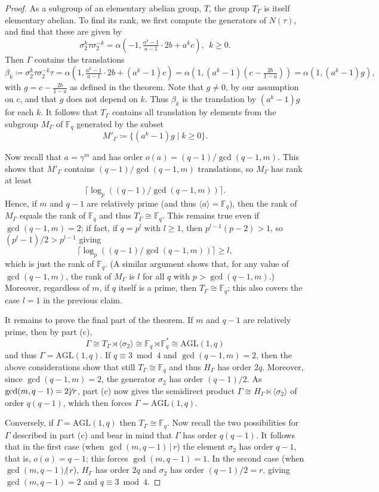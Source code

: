 \documentclass[12pt]{article}
\theoremstyle{definition}\newtheorem{definition}{Definition}[section]
\begin{document}
\begin{proof}
As a subgroup of an elementary abelian group, $T$, the group $T_\Gamma$ is itself elementary abelian. To find its rank, we first compute the generators of $N(\tau)$, and find that these are given by
\[\sigma_2^{k}\tau\sigma_2^{-k} = \alpha(-1,\tfrac{a^k-1}{a-1}\!\cdot\! 2b+a^kc),\;\,k\geq 0.\]
Then $\Gamma$ contains the translations
\[\beta_k\coloneqq \sigma_2^{k}\tau\sigma_2^{-k}\tau = \alpha(1,\tfrac{a^k-1}{a-1}\!\cdot\! 2b+(a^{k}-1)c)
=\alpha(1,(a^k-1)(c-\tfrac{2b}{1-a}))=\alpha(1,(a^k-1)g),\]
with $g=c-\tfrac{2b}{1-a}$ as defined in the theorem. Note that $g\neq 0$, by our assumption on $c$, and that $g$ does not depend on $k$. Thus $\beta_k$ is the translation by $(a^k-1)g$ for each $k$. It follows that $T_\Gamma$ contains all translation by elements from the subgroup $M_\Gamma$ of $\mathbb{F}_q$ generated by the subset
\[M'_\Gamma \coloneqq  \{(a^k-1)g\mid k\geq 0\}.\]

Now recall that $a=\gamma^m$ and has order $o(a)=(q-1)/\gcd(q-1,m)$. This shows that $M'_\Gamma$ contains $(q-1)/\gcd(q-1,m)$ translations, so $M_\Gamma$ has rank at least 
\[\lceil \log_{p} ((q-1)/\gcd(q-1,m))\rceil.\]
Hence, if $m$ and $q-1$ are relatively prime (and thus $\langle a\rangle=\mathbb{F}_q$), then the rank of $M_\Gamma$ equals the rank of $\mathbb{F}_q$ and thus $T_{\Gamma}\cong \mathbb{F}_q$. This remains true even if $\gcd(q-1,m)=2$; if fact, if $q=p^l$ with $l\geq 1$, then
$p^{l -1}(p-2)> 1$, so $(p^l -1)/2> p^{l -1}$ giving 
\[\lceil \log_{p} ((q-1)/\gcd(q-1,m))\rceil \geq l,\] 
which is just the rank of $\mathbb{F}_q$. (A similar argument shows that, for any value of $\gcd(q-1,m)$, the rank of $M_\Gamma$ is $l$ for all $q$ with $p>\gcd(q-1,m)$.) Moreover, regardless of $m$, if $q$ itself is a prime, then $T_{\Gamma}\cong \mathbb{F}_q$; this also covers the case $l =1$ in the previous claim. 

It remains to prove the final part of the theorem. If $m$ and $q-1$ are relatively prime, then by part (c), 
\[\Gamma \cong T_\Gamma \rtimes \langle \sigma_2\rangle \cong \mathbb{F}_q\rtimes \mathbb{F}_q^{*}\cong\mathrm{AGL}(1,q)\]
and thus $\Gamma=\mathrm{AGL}(1,q)$. If $q\equiv 3\bmod 4$ and $\gcd(q-1,m)=2$, then the above considerations show that still $T_\Gamma\cong\mathbb{F}_q$ and thus $H_\Gamma$ has order $2q$. Moreover, since $\gcd(q-1,m)=2$, the generator $\sigma_2$ has order $(q-1)/2$. As $\gcd(m,q-1)=2\!\!\not\!|\,r$, part (c) now gives the semidirect product $\Gamma\cong H_{\Gamma} \ltimes \langle \sigma_2\rangle$ of order $q(q-1)$, which then forces $\Gamma=\mathrm{AGL}(1,q)$.

Conversely, if $\Gamma=\mathrm{AGL}(1,q)$ then $T_\Gamma\cong\mathbb{F}_q$. Now recall the two possibilities for $\Gamma$ described in part (c) and bear in mind that $\Gamma$ has order $q(q-1)$. It follows that in the first case (when $\gcd(m,q-1)\,|\,r$) the element $\sigma_2$ has order $q-1$, that is, $o(a)=q-1$; this forces $\gcd(m,q-1)=1$. In the second case (when $\gcd(m,q-1)\!\!\not|\,r$), $H_\Gamma$ has order $2q$ and $\sigma_2$ has order $(q-1)/2=r$, giving $\gcd(m,q-1)=2$ and $q\equiv 3\bmod 4$.
\end{proof}
\bigskip
\end{document}
